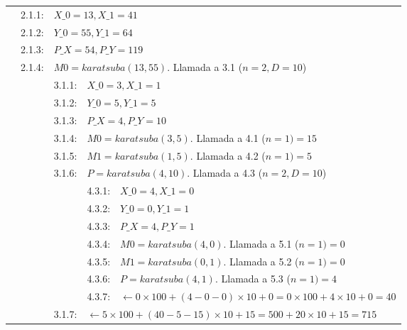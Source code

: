 \documentclass[titlepage,a4paper]{article}
\begin{document}
\begin{longtable}[r]{lllllll}
\multicolumn{2}{l}{}     & 2.1.1:     & \multicolumn{4}{l}{$X\_0=13, X\_1=41$}     \\
\multicolumn{2}{l}{}     & 2.1.2:     & \multicolumn{4}{l}{$Y\_0=55, Y\_1=64$}     \\
\multicolumn{2}{l}{}     & 2.1.3:     & \multicolumn{4}{l}{$P\_X=54, P\_Y=119$}     \\
\multicolumn{2}{l}{}     & 2.1.4:     & \multicolumn{4}{l}{$M0=karatsuba(13,55)$. Llamada a 3.1 ($n=2,D=10$)}     \\
\multicolumn{3}{l}{}     & 3.1.1:     & \multicolumn{3}{l}{$X\_0=3, X\_1=1$}     \\
\multicolumn{3}{l}{}     & 3.1.2:     & \multicolumn{3}{l}{$Y\_0=5, Y\_1=5$}     \\
\multicolumn{3}{l}{}     & 3.1.3:     & \multicolumn{3}{l}{$P\_X=4, P\_Y=10$}     \\
\multicolumn{3}{l}{}     & 3.1.4:     & \multicolumn{3}{l}{$M0=karatsuba(3,5)$. Llamada a 4.1 ($n=1) = \boxed{15}$}     \\
\multicolumn{3}{l}{}     & 3.1.5:     & \multicolumn{3}{l}{$M1=karatsuba(1,5)$. Llamada a 4.2 ($n=1) = \boxed{5}$}     \\
\multicolumn{3}{l}{}     & 3.1.6:     & \multicolumn{3}{l}{$P=karatsuba(4,10)$. Llamada a 4.3 ($n=2,D=10$)}     \\
\multicolumn{4}{l}{}     & 4.3.1:     & \multicolumn{2}{l}{$X\_0=4, X\_1=0$}     \\
\multicolumn{4}{l}{}     & 4.3.2:     & \multicolumn{2}{l}{$Y\_0=0, Y\_1=1$}     \\
\multicolumn{4}{l}{}     & 4.3.3:     & \multicolumn{2}{l}{$P\_X=4, P\_Y=1$}     \\
\multicolumn{4}{l}{}     & 4.3.4:     & \multicolumn{2}{l}{$M0=karatsuba(4,0)$. Llamada a 5.1 ($n=1) = \boxed{0}$}     \\
\multicolumn{4}{l}{}     & 4.3.5:     & \multicolumn{2}{l}{$M1=karatsuba(0,1)$. Llamada a 5.2 ($n=1) = \boxed{0}$}     \\
\multicolumn{4}{l}{}     & 4.3.6:     & \multicolumn{2}{l}{$P=karatsuba(4,1)$. Llamada a 5.3 ($n=1) = \boxed{4}$}     \\
\multicolumn{4}{l}{}     & 4.3.7:     & \multicolumn{2}{l}{$\leftarrow 0\times 100 + (4-0-0)\times 10 + 0 =  0\times 100 + 4\times 10 + 0 = \boxed{40}$}     \\
\multicolumn{3}{l}{}     & 3.1.7:     & \multicolumn{3}{l}{$\leftarrow 5\times 100 + (40-5-15)\times 10 + 15 =  500 + 20\times 10 + 15 = \boxed{715}$}     \\


\end{longtable}
\end{document}
